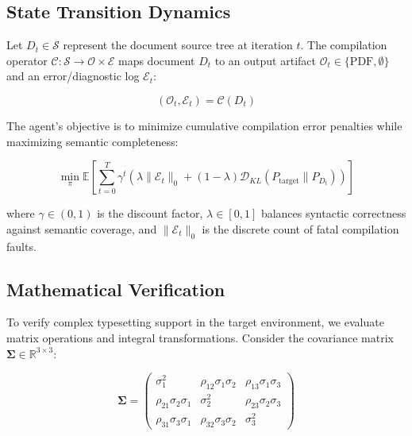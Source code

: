\documentclass[11pt,a4paper]{article}
\begin{document}
\subsection{State Transition Dynamics}
Let $D_t \in \mathcal{S}$ represent the document source tree at iteration $t$. The compilation operator $\mathcal{C}: \mathcal{S} \to \mathcal{O} \times \mathcal{E}$ maps document $D_t$ to an output artifact $\mathcal{O}_t \in \{\text{PDF}, \emptyset\}$ and an error/diagnostic log $\mathcal{E}_t$:

\begin{equation}
    (\mathcal{O}_t, \mathcal{E}_t) = \mathcal{C}(D_t)
    \label{eq:compilation}
\end{equation}

The agent's objective is to minimize cumulative compilation error penalties while maximizing semantic completeness:

\begin{equation}
    \min_{\pi} \mathbb{E}\left[ \sum_{t=0}^{T} \gamma^t \left( \lambda \|\mathcal{E}_t\|_0 + (1 - \lambda) \mathcal{D}_{KL}(P_{\text{target}} \parallel P_{D_t}) \right) \right]
    \label{eq:objective}
\end{equation}

where $\gamma \in (0, 1)$ is the discount factor, $\lambda \in [0, 1]$ balances syntactic correctness against semantic coverage, and $\|\mathcal{E}_t\|_0$ is the discrete count of fatal compilation faults.

\subsection{Mathematical Verification}
To verify complex typesetting support in the target environment, we evaluate matrix operations and integral transformations. Consider the covariance matrix $\boldsymbol{\Sigma} \in \mathbb{R}^{3 \times 3}$:

\begin{equation}
    \boldsymbol{\Sigma} = 
    \begin{pmatrix}
        \sigma_1^2 & \rho_{12}\sigma_1\sigma_2 & \rho_{13}\sigma_1\sigma_3 \\
        \rho_{21}\sigma_2\sigma_1 & \sigma_2^2 & \rho_{23}\sigma_2\sigma_3 \\
        \rho_{31}\sigma_3\sigma_1 & \rho_{32}\sigma_3\sigma_2 & \sigma_3^2
    \end{pmatrix}
    \label{eq:matrix}
\end{equation}
\end{document}
